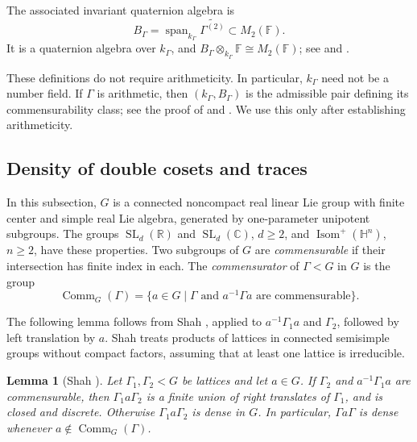 \documentclass[reqno]{amsart}
\newtheorem{lemma}[theorem]{Lemma}
\theoremstyle{remark}
\DeclareMathOperator{\Comm}{Comm}
\DeclareMathOperator{\SL}{SL}
\newcommand{\R}{\mathbb R}
\newcommand{\C}{\mathbb C}
\newcommand{\F}{\mathbb F}
\begin{document}
The associated invariant quaternion algebra is
\begin{equation}\label{eq:invariantalgebra}
B_\Gamma=\operatorname{span}_{k_\Gamma}\widetilde{\Gamma^{(2)}}
\subset M_2(\F).
\end{equation}
It is a quaternion algebra over $k_\Gamma$, and $B_\Gamma\otimes_{k_\Gamma}\F\cong M_2(\F)$; see \cite[p.~186, equation (19)]{Vinberg} and \cite[Chapter 3]{MaclachlanReid}.

These definitions do not require arithmeticity. In particular, $k_\Gamma$ need not be a number field. If $\Gamma$ is arithmetic, then $(k_\Gamma,B_\Gamma)$ is the admissible pair defining its commensurability class; see the proof of \cite[Theorem 4, pp.~187--189]{Vinberg} and \cite[Chapter 8]{MaclachlanReid}. We use this only after establishing arithmeticity.

\subsection{Density of double cosets and traces}\label{sec:double}

In this subsection, $G$ is a connected noncompact real linear Lie group with finite center and simple real Lie algebra, generated by one-parameter unipotent subgroups. The groups $\SL_d(\R)$ and $\SL_d(\C)$, $d\ge2$, and $\operatorname{Isom}^+(\mathbb H^n)$, $n\ge2$, have these properties. Two subgroups of $G$ are {\em commensurable} if their intersection has finite index in each. The {\em commensurator} of $\Gamma < G$ in $G$ is the group
$$
\Comm_G(\Gamma)=\{a\in G\mid \Gamma \text{ and } a^{-1}\Gamma a
\text{ are commensurable}\}.
$$

The following lemma follows from Shah \cite[Corollary 1.5]{Shah}, applied to $a^{-1}\Gamma_1a$ and $\Gamma_2$, followed by left translation by $a$. Shah treats products of lattices in connected semisimple groups without compact factors, assuming that at least one lattice is irreducible.

\begin{lemma}[Shah {\cite[Corollary 1.5]{Shah}}]\label{lem:double}
Let $\Gamma_1,\Gamma_2<G$ be lattices and let $a\in G$. If $\Gamma_2$ and $a^{-1}\Gamma_1a$ are commensurable, then $\Gamma_1a\Gamma_2$ is a finite union of right translates of $\Gamma_1$, and is closed and discrete. Otherwise $\Gamma_1a\Gamma_2$ is dense in $G$. In particular, $\Gamma a\Gamma$ is dense whenever $a\notin\Comm_G(\Gamma)$.
\end{lemma}
\end{document}
